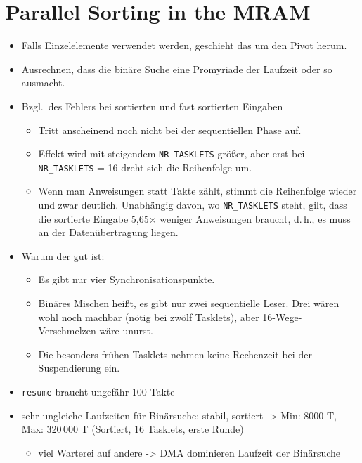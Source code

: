 \chapter{Parallel Sorting in the MRAM}
\label{sec:par}

\begin{itemize}
	\item
	Falls Einzelelemente verwendet werden, geschieht das um den Pivot herum.

	\item
	Ausrechnen, dass die binäre Suche eine Promyriade der Laufzeit oder so ausmacht.

	\item
	Bzgl.\ des Fehlers bei sortierten und fast sortierten Eingaben
	\begin{itemize}
		\item
		Tritt anscheinend noch nicht bei der sequentiellen Phase auf.

		\item
		Effekt wird mit steigendem \lstinline|NR_TASKLETS| größer, aber erst bei \lstinline|NR_TASKLETS| = 16 dreht sich die Reihenfolge um.

		\item
		Wenn man Anweisungen statt Takte zählt, stimmt die Reihenfolge wieder und zwar deutlich.
		Unabhängig davon, wo \lstinline|NR_TASKLETS| steht, gilt, dass die sortierte Eingabe 5,65× weniger Anweisungen braucht, d.\,h., es muss an der Datenübertragung liegen.
	\end{itemize}

	\item
	Warum der \MS{} gut ist:
	\begin{itemize}
		\item
		Es gibt nur vier Synchronisationspunkte.

		\item
		Binäres Mischen heißt, es gibt nur zwei sequentielle Leser. Drei wären wohl noch machbar (nötig bei zwölf Tasklets), aber 16-Wege-Verschmelzen wäre unurst.

		\item
		Die besonders frühen Tasklets nehmen keine Rechenzeit bei der Suspendierung ein.
	\end{itemize}

	\item
	\lstinline|resume| braucht ungefähr 100 Takte

	\item
	sehr ungleiche Laufzeiten für Binärsuche:
	stabil, sortiert -> Min: 8000 T, Max: 320\,000 T (Sortiert, 16 Tasklets, erste Runde)
	\begin{itemize}
		\item
		viel Warterei auf andere -> DMA dominieren Laufzeit der Binärsuche
	\end{itemize}
\end{itemize}

